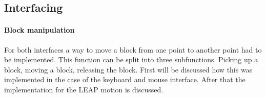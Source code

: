 \subsection{Interfacing}

\paragraph{Block manipulation}
For both interfaces a way to move a block from one point to another point had to be implemented. This function can be split into three subfunctions. Picking up a block, moving a block, releasing the block. First will be discussed how this was implemented in the case of the keyboard and mouse interface. After that the implementation for the LEAP motion is discussed.


